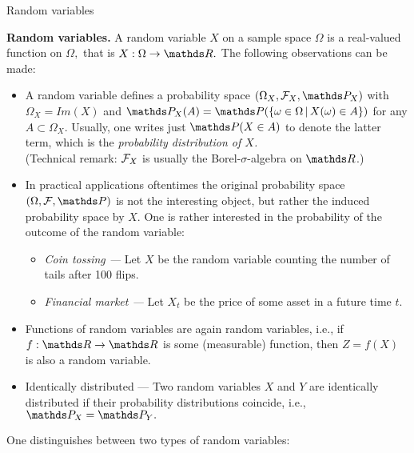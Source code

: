 \documentclass[11pt,compress,t,notes=noshow, xcolor=table]{beamer}
\begin{document}
\begin{vbframe}{Random variables}  
 
 \textbf{Random variables.} A random variable $X$ on a sample space $\Omega$ is a real-valued function on $\Omega,$ that is $X:\Omega \to \R.$ The following observations can be made:
 \begin{itemize}
 	\item 	A random variable defines a probability space $(\Omega_X,\F_X,\P_X)$ with $\Omega_X= Im(X)$ and $\P_X(A)=\P(\{\omega\in\Omega \, | \, X(\omega) \in A \})$ for any $A\subset \Omega_X.$ Usually, one writes just $\P(X\in A)$ to denote the latter term, which is the \emph{probability distribution of $X$.}\\
 	
 	{\tiny (Technical remark: $\mathcal{F}_X$ is usually the Borel-$\sigma$-algebra on $\R$.)}
 	\item In practical applications oftentimes the original probability space $(\Omega,\F,\P)$ is not the interesting object, but rather the induced probability space by $X.$ 
 	One is rather interested in the probability of the outcome of the random variable:
 	\begin{itemize}
 		\item \emph{Coin tossing ---} Let $X$ be the random variable counting the number of tails after 100 flips.
 		\item \emph{Financial market ---} Let $X_t$ be the  price of some asset in a future time $t.$
 	\end{itemize}
 	\framebreak
 	\item Functions of random variables are again random variables, i.e., if $f:\R \to \R$ is some (measurable) function, then $Z=f(X)$ is also a random variable.\\
 	\item Identically distributed --- Two random variables $X$ and $Y$ are identically distributed if their probability distributions coincide, i.e., $\P_X = \P_Y.$ 
 \end{itemize}
 One distinguishes between two types of random variables:
 \begin{itemize}
 	

\end{itemize}
\end{vbframe}
\end{document}
